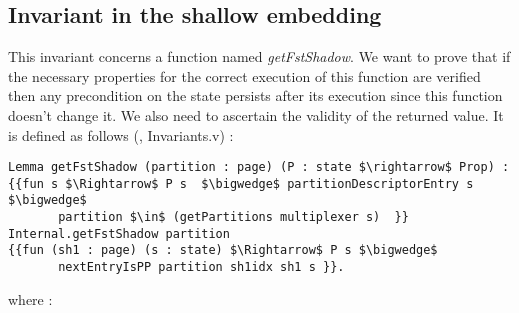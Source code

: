 \subsection{Invariant in the shallow embedding} \label{getFstInv}
This invariant concerns a function named \textit{getFstShadow}. We want to prove that if the necessary properties for the correct execution of this function are verified then any precondition on the state persists after its execution since this function doesn't change it. We also need to ascertain the validity of the returned value. It is defined as follows (\cite{PIP}, Invariants.v) :  
\begin{lstlisting}[caption = {getFstShadow invariant in the shallow embedding}, xleftmargin=-.02\textwidth,
xrightmargin=-.02\textwidth,mathescape=true]
Lemma getFstShadow (partition : page) (P : state $\rightarrow$ Prop) :
{{fun s $\Rightarrow$ P s  $\bigwedge$ partitionDescriptorEntry s $\bigwedge$ 
	   partition $\in$ (getPartitions multiplexer s)  }} 
Internal.getFstShadow partition
{{fun (sh1 : page) (s : state) $\Rightarrow$ P s $\bigwedge$ 
	   nextEntryIsPP partition sh1idx sh1 s }}.
\end{lstlisting}
where :
